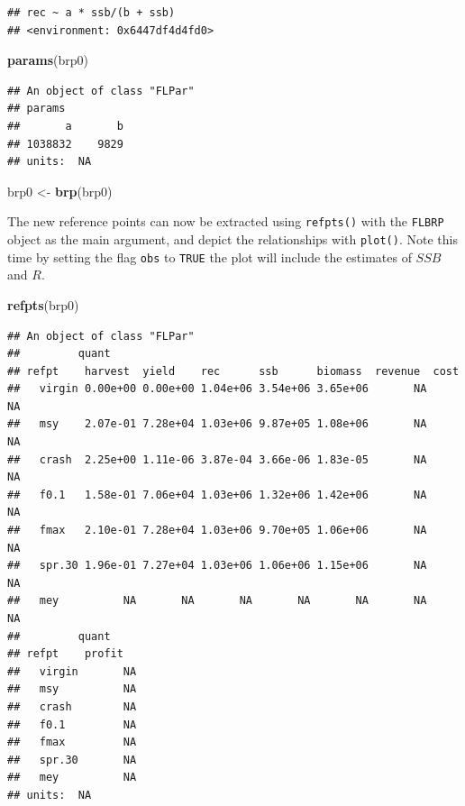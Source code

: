 \documentclass[
]{book}
\newenvironment{Shaded}{\begin{snugshade}}{\end{snugshade}}
\newcommand{\FunctionTok}[1]{\textcolor[rgb]{0.13,0.29,0.53}{\textbf{#1}}}
\newcommand{\NormalTok}[1]{#1}
\newcommand{\OtherTok}[1]{\textcolor[rgb]{0.56,0.35,0.01}{#1}}
\begin{document}
\begin{verbatim}
## rec ~ a * ssb/(b + ssb)
## <environment: 0x6447df4d4fd0>
\end{verbatim}

\begin{Shaded}
\begin{Highlighting}[]
\FunctionTok{params}\NormalTok{(brp0)}
\end{Highlighting}
\end{Shaded}

\begin{verbatim}
## An object of class "FLPar"
## params
##       a       b 
## 1038832    9829 
## units:  NA
\end{verbatim}

\begin{Shaded}
\begin{Highlighting}[]
\NormalTok{brp0 }\OtherTok{\textless{}{-}} \FunctionTok{brp}\NormalTok{(brp0)}
\end{Highlighting}
\end{Shaded}

The new reference points can now be extracted using \texttt{refpts()} with the \texttt{FLBRP} object as the main argument, and depict the relationships with \texttt{plot()}. Note this time by setting the flag \texttt{obs} to \texttt{TRUE} the plot will include the estimates of \(SSB\) and \(R\).

\begin{Shaded}
\begin{Highlighting}[]
\FunctionTok{refpts}\NormalTok{(brp0)}
\end{Highlighting}
\end{Shaded}

\begin{verbatim}
## An object of class "FLPar"
##         quant
## refpt    harvest  yield    rec      ssb      biomass  revenue  cost    
##   virgin 0.00e+00 0.00e+00 1.04e+06 3.54e+06 3.65e+06       NA       NA
##   msy    2.07e-01 7.28e+04 1.03e+06 9.87e+05 1.08e+06       NA       NA
##   crash  2.25e+00 1.11e-06 3.87e-04 3.66e-06 1.83e-05       NA       NA
##   f0.1   1.58e-01 7.06e+04 1.03e+06 1.32e+06 1.42e+06       NA       NA
##   fmax   2.10e-01 7.28e+04 1.03e+06 9.70e+05 1.06e+06       NA       NA
##   spr.30 1.96e-01 7.27e+04 1.03e+06 1.06e+06 1.15e+06       NA       NA
##   mey          NA       NA       NA       NA       NA       NA       NA
##         quant
## refpt    profit  
##   virgin       NA
##   msy          NA
##   crash        NA
##   f0.1         NA
##   fmax         NA
##   spr.30       NA
##   mey          NA
## units:  NA
\end{verbatim}
\end{document}
